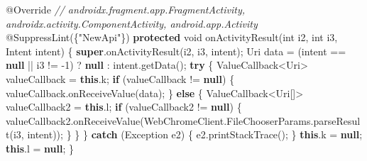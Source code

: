 \documentclass[
]{article}
\newenvironment{Shaded}{}{}
\newcommand{\AttributeTok}[1]{\textcolor[rgb]{0.49,0.56,0.16}{#1}}
\newcommand{\BuiltInTok}[1]{\textcolor[rgb]{0.00,0.50,0.00}{#1}}
\newcommand{\CommentTok}[1]{\textcolor[rgb]{0.38,0.63,0.69}{\textit{#1}}}
\newcommand{\ControlFlowTok}[1]{\textcolor[rgb]{0.00,0.44,0.13}{\textbf{#1}}}
\newcommand{\DataTypeTok}[1]{\textcolor[rgb]{0.56,0.13,0.00}{#1}}
\newcommand{\DecValTok}[1]{\textcolor[rgb]{0.25,0.63,0.44}{#1}}
\newcommand{\FunctionTok}[1]{\textcolor[rgb]{0.02,0.16,0.49}{#1}}
\newcommand{\KeywordTok}[1]{\textcolor[rgb]{0.00,0.44,0.13}{\textbf{#1}}}
\newcommand{\NormalTok}[1]{#1}
\newcommand{\OperatorTok}[1]{\textcolor[rgb]{0.40,0.40,0.40}{#1}}
\newcommand{\StringTok}[1]{\textcolor[rgb]{0.25,0.44,0.63}{#1}}
\begin{document}
\begin{Shaded}
\begin{Highlighting}[]
    \AttributeTok{@Override} \CommentTok{// androidx.fragment.app.FragmentActivity, androidx.activity.ComponentActivity, android.app.Activity}
    \AttributeTok{@SuppressLint}\OperatorTok{(\{}\StringTok{"NewApi"}\OperatorTok{\})}
    \KeywordTok{protected} \DataTypeTok{void} \FunctionTok{onActivityResult}\OperatorTok{(}\DataTypeTok{int}\NormalTok{ i2}\OperatorTok{,} \DataTypeTok{int}\NormalTok{ i3}\OperatorTok{,}\NormalTok{ Intent intent}\OperatorTok{)} \OperatorTok{\{}
        \KeywordTok{super}\OperatorTok{.}\FunctionTok{onActivityResult}\OperatorTok{(}\NormalTok{i2}\OperatorTok{,}\NormalTok{ i3}\OperatorTok{,}\NormalTok{ intent}\OperatorTok{);}
\NormalTok{        Uri data }\OperatorTok{=} \OperatorTok{(}\NormalTok{intent }\OperatorTok{==} \KeywordTok{null} \OperatorTok{||}\NormalTok{ i3 }\OperatorTok{!=} \OperatorTok{{-}}\DecValTok{1}\OperatorTok{)} \OperatorTok{?} \KeywordTok{null} \OperatorTok{:}\NormalTok{ intent}\OperatorTok{.}\FunctionTok{getData}\OperatorTok{();}
        \ControlFlowTok{try} \OperatorTok{\{}
\NormalTok{            ValueCallback}\OperatorTok{\textless{}}\NormalTok{Uri}\OperatorTok{\textgreater{}}\NormalTok{ valueCallback }\OperatorTok{=} \KeywordTok{this}\OperatorTok{.}\FunctionTok{k}\OperatorTok{;}
            \ControlFlowTok{if} \OperatorTok{(}\NormalTok{valueCallback }\OperatorTok{!=} \KeywordTok{null}\OperatorTok{)} \OperatorTok{\{}
\NormalTok{                valueCallback}\OperatorTok{.}\FunctionTok{onReceiveValue}\OperatorTok{(}\NormalTok{data}\OperatorTok{);}
            \OperatorTok{\}} \ControlFlowTok{else} \OperatorTok{\{}
\NormalTok{                ValueCallback}\OperatorTok{\textless{}}\NormalTok{Uri}\OperatorTok{[]\textgreater{}}\NormalTok{ valueCallback2 }\OperatorTok{=} \KeywordTok{this}\OperatorTok{.}\FunctionTok{l}\OperatorTok{;}
                \ControlFlowTok{if} \OperatorTok{(}\NormalTok{valueCallback2 }\OperatorTok{!=} \KeywordTok{null}\OperatorTok{)} \OperatorTok{\{}
\NormalTok{                    valueCallback2}\OperatorTok{.}\FunctionTok{onReceiveValue}\OperatorTok{(}\NormalTok{WebChromeClient}\OperatorTok{.}\FunctionTok{FileChooserParams}\OperatorTok{.}\FunctionTok{parseResult}\OperatorTok{(}\NormalTok{i3}\OperatorTok{,}\NormalTok{ intent}\OperatorTok{));}
                \OperatorTok{\}}
            \OperatorTok{\}}
        \OperatorTok{\}} \ControlFlowTok{catch} \OperatorTok{(}\BuiltInTok{Exception}\NormalTok{ e2}\OperatorTok{)} \OperatorTok{\{}
\NormalTok{            e2}\OperatorTok{.}\FunctionTok{printStackTrace}\OperatorTok{();}
        \OperatorTok{\}}
        \KeywordTok{this}\OperatorTok{.}\FunctionTok{k} \OperatorTok{=} \KeywordTok{null}\OperatorTok{;}
        \KeywordTok{this}\OperatorTok{.}\FunctionTok{l} \OperatorTok{=} \KeywordTok{null}\OperatorTok{;}
    \OperatorTok{\}}


\end{Highlighting}
\end{Shaded}
\end{document}
